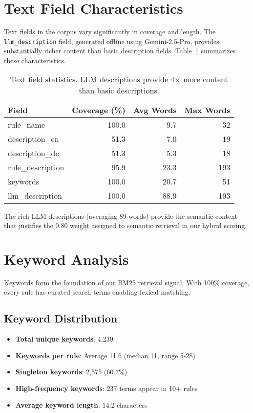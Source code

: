 \section{Text Field Characteristics}

Text fields in the corpus vary significantly in coverage and length. The \texttt{llm\_description} field, generated offline using Gemini-2.5-Pro, provides substantially richer content than basic description fields. Table~\ref{tab:text-stats} summarizes these characteristics.

\begin{table}[h]
\centering
\begin{tabular}{lrrr}
\toprule
\textbf{Field} & \textbf{Coverage (\%)} & \textbf{Avg Words} & \textbf{Max Words} \\
\midrule
rule\_name & 100.0 & 9.7 & 32 \\
description\_en & 51.3 & 7.0 & 19 \\
description\_de & 51.3 & 5.3 & 18 \\
rule\_description & 95.9 & 23.3 & 193 \\
keywords & 100.0 & 20.7 & 51 \\
llm\_description & 100.0 & 88.9 & 193 \\
\bottomrule
\end{tabular}
\caption{Text field statistics. LLM descriptions provide 4× more content than basic descriptions.}
\label{tab:text-stats}
\end{table}

The rich LLM descriptions (averaging 89 words) provide the semantic context that justifies the 0.80 weight assigned to semantic retrieval in our hybrid scoring.

\section{Keyword Analysis}

Keywords form the foundation of our BM25 retrieval signal. With 100\% coverage, every rule has curated search terms enabling lexical matching.

\subsection{Keyword Distribution}

\begin{itemize}[leftmargin=*,itemsep=2pt,topsep=2pt]
 \item \textbf{Total unique keywords}: 4,239
 \item \textbf{Keywords per rule}: Average 11.6 (median 11, range 5-28)
 \item \textbf{Singleton keywords}: 2,575 (60.7\%)
 \item \textbf{High-frequency keywords}: 237 terms appear in 10+ rules
 \item \textbf{Average keyword length}: 14.2 characters
\end{itemize}

